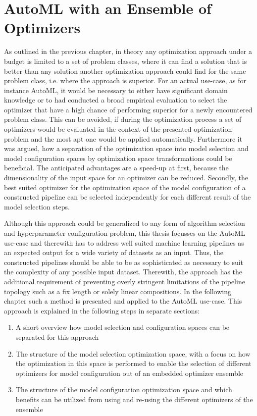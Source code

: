 %
\chapter{AutoML with an Ensemble of Optimizers}
\label{sec:approach}
As outlined in the previous chapter, in theory any optimization approach under a budget is limited to a set of problem classes, where it can find a solution that is better than any solution another optimization approach could find for the same problem class, i.e. where the approach is superior.
For an actual use-case, as for instance AutoML, it would be necessary to either have significant domain knowledge or to had conducted a broad empirical evaluation to select the optimizer that have a high chance of performing superior for a newly encountered problem class.
This can be avoided, if during the optimization process a set of optimizers would be evaluated in the context of the presented optimization problem and the most apt one would be applied automatically.\newline
Furthermore it was argued, how a separation of the optimization space into model selection and model configuration spaces by optimization space transformations could be beneficial.
The anticipated advantages are a speed-up at first, because the dimensionality of the input space for an optimizer can be reduced.
Secondly, the best suited optimizer for the optimization space of the model configuration of a constructed pipeline can be selected independently for each different result of the model selection steps.

Although this approach could be generalized to any form of algorithm selection and hyperparameter configuration problem, this thesis focusses on the AutoML use-case and therewith has to address well suited machine learning pipelines as an expected output for a wide variety of datasets as an input.
Thus, the constructed pipelines should be able to be as sophisticated as necessary to suit the complexity of any possible input dataset.
Therewith, the approach has the additional requirement of preventing overly stringent limitations of the pipeline topology such as a fix length or solely linear compositions.\newline
In the following chapter such a method is presented and applied to the AutoML use-case.
This approach is explained in the following steps in separate sections:
\begin{enumerate}
    \item A short overview how model selection and configuration spaces can be separated for this approach
    \item The structure of the model selection optimization space, with a focus on how the optimization in this space is performed to enable the selection of different optimizers for model configuration out of an embedded optimizer ensemble
    \item The structure of the model configuration optimization space and which benefits can be utilized from using and re-using the different optimizers of the ensemble
\end{enumerate}

